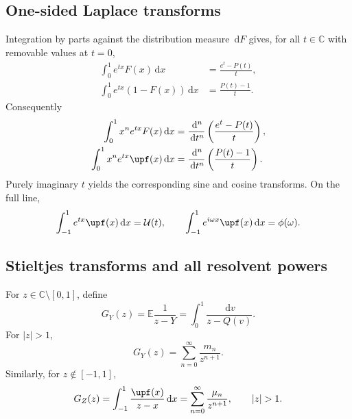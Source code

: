 \documentclass[11pt,oneside]{article}
\theoremstyle{definition}
\theoremstyle{remark}
\newcommand{\F}{F}
\newcommand{\Q}{Q}
\newcommand{\E}{\mathbb E}
\newcommand{\C}{\mathbb C}
\newcommand{\dd}{\,\mathrm d}
\newcommand{\1}{\mathbf 1}
\begin{document}
\subsection{One-sided Laplace transforms}

Integration by parts against the distribution measure \(\dd\F\) gives, for all
\(t\in\C\) with removable values at \(t=0\),
\begin{align}
 \int_0^1e^{tx}\F(x)\dd x
 &=\frac{e^t-P(t)}t,
 \label{p4:eq:Laplace-F}\\
 \int_0^1e^{tx}(1-\F(x))\dd x
 &=\frac{P(t)-1}t.
 \label{p4:eq:Laplace-up-half}
\end{align}
Consequently
\begin{align}
 \int_0^1x^ne^{tx}\F(x)\dd x
 &=\frac{\dd^n}{\dd t^n}\left(\frac{e^t-P(t)}t\right),
 \label{p4:eq:exp-poly-F}\\
 \int_0^1x^ne^{tx}\upf(x)\dd x
 &=\frac{\dd^n}{\dd t^n}\left(\frac{P(t)-1}t\right).
 \label{p4:eq:exp-poly-up}
\end{align}
Purely imaginary \(t\) yields the corresponding sine and cosine transforms.  On the
full line,
\begin{equation}\label{p4:eq:bilateral-up-transform}
 \int_{-1}^1e^{tx}\upf(x)\dd x=\mathcal U(t),
 \qquad
 \int_{-1}^1e^{i\omega x}\upf(x)\dd x=\phi(\omega).
\end{equation}

\subsection{Stieltjes transforms and all resolvent powers}

For \(z\in\C\setminus[0,1]\), define
\begin{equation}\label{p4:eq:GY-def}
 G_Y(z)=\E\frac1{z-Y}
 =\int_0^1\frac{\dd v}{z-\Q(v)}.
\end{equation}
For \(|z|>1\),
\begin{equation}\label{p4:eq:GY-moment-series}
 G_Y(z)=\sum_{n=0}^{\infty}\frac{m_n}{z^{n+1}}.
\end{equation}
Similarly, for \(z\notin[-1,1]\),
\begin{equation}\label{p4:eq:GZ-def}
 G_Z(z)=\int_{-1}^1\frac{\upf(x)}{z-x}\dd x
 =\sum_{n=0}^{\infty}\frac{\mu_n}{z^{n+1}},
 \qquad |z|>1.
\end{equation}
\end{document}
